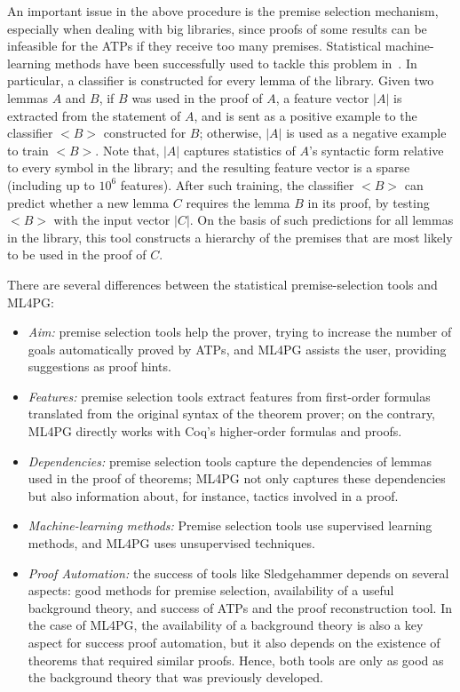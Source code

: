 An important issue in the above procedure is the premise selection mechanism, especially when dealing with big libraries, since proofs of some results can be infeasible for the ATPs if they receive too many premises. Statistical machine-learning methods have been
successfully used to tackle this problem in~\cite{UrbanSPV08,K13,holyhammer}. In particular, a classifier is constructed for every
lemma of the library. Given two lemmas $A$ and $B$, if $B$ was used in the proof of $A$, a feature vector $|A|$  is extracted
from the statement of $A$, and is sent as a positive example to the classifier $<B>$ constructed for $B$; otherwise, $|A|$ is
used as a negative example to train $<B>$.
Note that, $|A|$  captures statistics of $A$'s syntactic form relative to
every symbol in the library; and the resulting feature vector is a sparse (including up to $10^6$ features).
 After such training, the classifier $<B>$ can predict whether a new lemma $C$ requires
the lemma $B$ in its proof, by testing $<B>$ with the input vector $|C|$. On the basis of such predictions for all lemmas in the library,  this tool constructs a hierarchy of the premises that are most likely to be used in the proof
of $C$.

There are several differences between the statistical premise-selection tools and ML4PG:

\begin{itemize}
 \item \emph{Aim:} premise selection tools help the prover, trying to increase the number of goals automatically proved by ATPs, and ML4PG
 assists the user, providing suggestions as proof hints.
 \item \emph{Features:} premise selection tools extract features from first-order formulas translated from the original syntax of the
 theorem prover; on the contrary, ML4PG directly works with Coq's higher-order formulas and proofs.
 \item \emph{Dependencies:} premise selection tools capture the dependencies of lemmas used in the proof of theorems; ML4PG not only
 captures these dependencies but also information about, for instance, tactics involved in a proof.
 \item \emph{Machine-learning methods:} Premise selection tools use supervised learning methods, and ML4PG uses unsupervised techniques.
 \item \emph{Proof Automation:} the success of tools like Sledgehammer depends on several aspects: good methods for premise selection,
 availability of a useful background theory, and success of ATPs and the proof reconstruction tool. In the case of ML4PG, the
 availability of a background theory is also a key aspect for success proof automation, but it also depends on the existence of
 theorems that required similar proofs. Hence, both tools are only as good as the background theory that was previously developed. \end{itemize}

